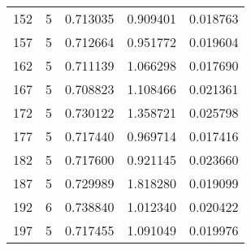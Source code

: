 \begin{tabular}{rrrrr}
152 & 5 & 0.713035 & 0.909401 & 0.018763 \\
157 & 5 & 0.712664 & 0.951772 & 0.019604 \\
162 & 5 & 0.711139 & 1.066298 & 0.017690 \\
167 & 5 & 0.708823 & 1.108466 & 0.021361 \\
172 & 5 & 0.730122 & 1.358721 & 0.025798 \\
177 & 5 & 0.717440 & 0.969714 & 0.017416 \\
182 & 5 & 0.717600 & 0.921145 & 0.023660 \\
187 & 5 & 0.729989 & 1.818280 & 0.019099 \\
192 & 6 & 0.738840 & 1.012340 & 0.020422 \\
197 & 5 & 0.717455 & 1.091049 & 0.019976 \\
\bottomrule
\end{tabular}

